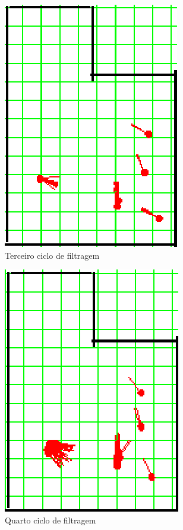 \begin{figure}[H]
  \centering
  \includegraphics[scale=1]{figuras/cen3_ex1/4.eps}
  \caption[Terceiro Ciclo de Filtragem]{Terceiro ciclo de filtragem}
  \label{img:cen3_ex1_4}
\end{figure}

\begin{figure}[H]
  \centering
  \includegraphics[scale=1]{figuras/cen3_ex1/5.eps}
  \caption[Quarto Ciclo de Filtragem]{Quarto ciclo de filtragem}
  \label{img:cen3_ex1_5}
\end{figure}

